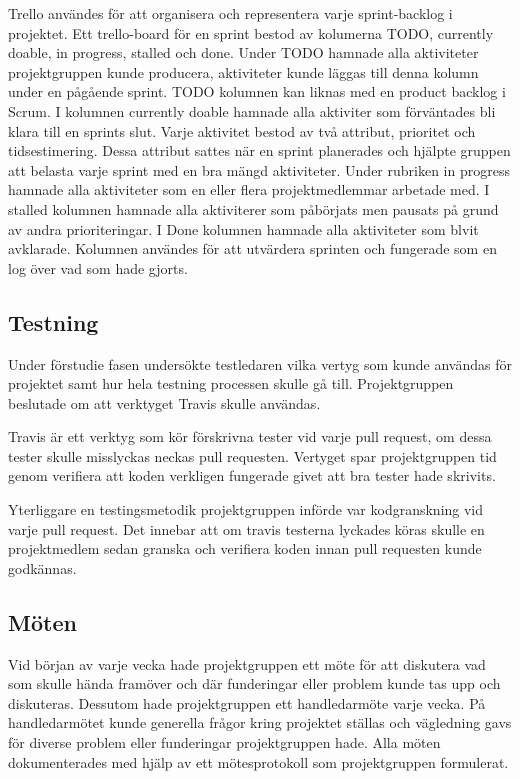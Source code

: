 Trello användes för att organisera och representera varje sprint-backlog i projektet. Ett trello-board för en sprint bestod av kolumerna TODO, currently doable, in progress, stalled och done. Under TODO hamnade alla aktiviteter projektgruppen kunde producera, aktiviteter kunde läggas till denna kolumn under en pågående sprint. TODO kolumnen kan liknas med en product backlog i Scrum. I kolumnen currently doable hamnade alla aktiviter som förväntades bli klara till en sprints slut. Varje aktivitet bestod av två attribut, prioritet och tidsestimering. Dessa attribut sattes när en sprint planerades och hjälpte gruppen att belasta varje sprint med en bra mängd aktiviteter. Under rubriken in progress hamnade alla aktiviteter som en eller flera projektmedlemmar arbetade med. I stalled kolumnen hamnade alla aktiviterer som påbörjats men pausats på grund av andra prioriteringar. I Done kolumnen hamnade alla aktiviteter som blvit avklarade. Kolumnen användes för att utvärdera sprinten och fungerade som en log över vad som hade gjorts.

\subsection{Testning}
Under förstudie fasen undersökte testledaren vilka vertyg som kunde användas för projektet samt hur hela testning processen skulle gå till. Projektgruppen beslutade om att verktyget Travis skulle användas. 

Travis är ett verktyg som kör förskrivna tester vid varje pull request, om dessa tester skulle misslyckas neckas pull requesten. Vertyget spar projektgruppen tid genom verifiera att koden verkligen fungerade givet att bra tester hade skrivits. 

Yterliggare en testingsmetodik projektgruppen införde var kodgranskning vid varje pull request. Det innebar att om travis testerna lyckades köras skulle en projektmedlem sedan granska och verifiera koden innan pull requesten kunde godkännas.

\subsection{Möten}
Vid början av varje vecka hade projektgruppen ett möte för att diskutera vad som skulle hända framöver och där funderingar eller problem kunde tas upp och diskuteras. Dessutom hade projektgruppen ett handledarmöte varje vecka. På handledarmötet kunde generella frågor kring projektet ställas och vägledning gavs för diverse problem eller funderingar projektgruppen hade. Alla möten dokumenterades med hjälp av ett mötesprotokoll som projektgruppen formulerat.

